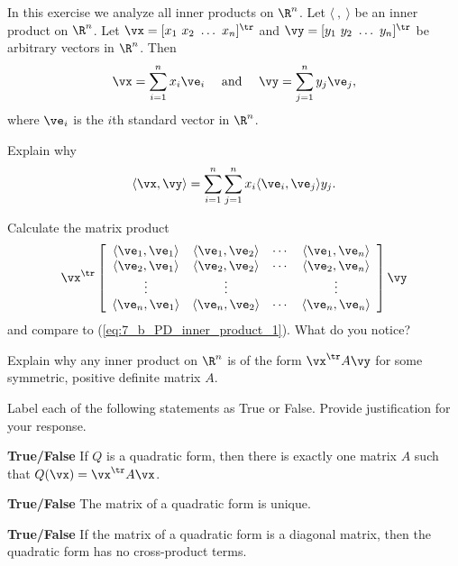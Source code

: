 \item \label{ex:7_b_PD_inner_product} In this exercise we analyze all inner products on $\R^n$.  Let $\langle \ , \ \rangle$ be an inner product on $\R^n$. Let $\vx = [x_1 \ x_2 \ \ldots \ x_n]^{\tr}$ and $\vy = [y_1 \ y_2 \ \ldots \ y_n]^{\tr}$ be arbitrary vectors in $\R^n$. Then
\[\vx = \sum_{i=1}^n x_i \ve_i \ \ \ \text{ and } \ \ \ \vy = \sum_{j=1}^n y_j \ve_j,\]
where $\ve_i$ is the $i$th standard vector in $\R^n$.
    \ba
    \item Explain why
    \begin{equation} \label{eq:7_b_PD_inner_product_1}
    \langle \vx, \vy \rangle = \sum_{i=1}^n \sum_{j=1}^n x_i \langle \ve_i, \ve_j \rangle y_j.
    \end{equation}


    \item Calculate the matrix product
\[\vx^{\tr} \left[ \begin{array}{cccc}
\langle \ve_1,\ve_1 \rangle & \langle \ve_1,\ve_2 \rangle & \cdots & \langle \ve_1,\ve_n \rangle \\
\langle \ve_2,\ve_1 \rangle & \langle \ve_2,\ve_2 \rangle & \cdots & \langle \ve_2,\ve_n \rangle \\
\vdots                      &  \vdots                       &       & \vdots \\
\langle \ve_n,\ve_1 \rangle & \langle \ve_n,\ve_2 \rangle & \cdots & \langle \ve_n,\ve_n \rangle
\end{array} \right] \vy\]
and compare to (\ref{eq:7_b_PD_inner_product_1}). What do you notice?

    \item Explain why any inner product on $\R^n$ is of the form $\vx^{\tr} A \vy$ for some symmetric, positive definite matrix $A$.

   
    \ea
	
\item Label each of the following statements as True or False. Provide justification for your response. 
	\ba
	\item \textbf{True/False} If $Q$ is a quadratic form, then there is exactly one matrix $A$ such that $Q(\vx) = \vx^{\tr}A\vx$. 	

	\item \textbf{True/False} The matrix of a quadratic form is unique.
	
	\item \textbf{True/False} If the matrix of a quadratic form is a diagonal matrix, then the quadratic form has no cross-product terms. 
	


